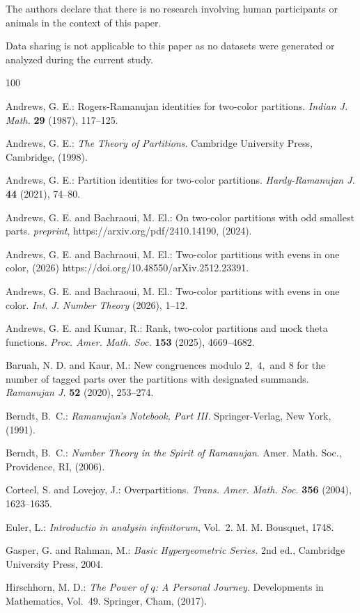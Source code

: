 \documentclass[12pt]{article}
\numberwithin{equation}{section}
\theoremstyle{definition}
\theoremstyle{remark}
\numberwithin{equation}{section}
\begin{document}
 The authors declare that there is no research involving human participants or animals in the context of this paper.	
 
 Data sharing is not applicable to this paper as no datasets were generated or analyzed during the current study.	


\begin{thebibliography}{100}
	
Andrews, G. E.: Rogers-Ramanujan identities for two-color partitions. 
\textit{Indian J. Math.} \textbf{29} (1987), 117--125.

Andrews, G. E.: \textit{The Theory of Partitions}. 
Cambridge University Press, Cambridge, (1998).

Andrews, G. E.: Partition identities for two-color partitions. 
\textit{Hardy-Ramanujan J.} \textbf{44} (2021), 74--80.

Andrews, G. E. and Bachraoui, M. El.: On two-color partitions with odd smallest parts. 
\textit{preprint}, https://arxiv.org/pdf/2410.14190, (2024).


Andrews, G. E. and Bachraoui, M. El.: Two-color partitions with evens in one color, (2026)
https://doi.org/10.48550/arXiv.2512.23391.

Andrews, G. E. and Bachraoui, M. El.: Two-color partitions with evens in one color. 
\textit{Int. J. Number Theory} (2026), 1--12.

Andrews, G. E. and Kumar, R.: Rank, two-color partitions and mock theta functions. 
\textit{Proc. Amer. Math. Soc.} \textbf{153} (2025), 4669--4682.

Baruah, N. D. and Kaur, M.: New congruences modulo $2,$ $4,$ and $8$ for the number of tagged parts over the partitions with designated summands. 
\textit{Ramanujan J.} \textbf{52} (2020), 253--274.

Berndt, B.~C.: \textit{Ramanujan's Notebook, Part III.} 
Springer-Verlag, New York, (1991).

Berndt, B.~C.: \textit{Number Theory in the Spirit of Ramanujan}. 
Amer. Math. Soc., Providence, RI, (2006).

Corteel, S. and Lovejoy, J.: Overpartitions. 
\textit{Trans. Amer. Math. Soc.} \textbf{356} (2004), 1623--1635.

Euler, L.: \textit{Introductio in analysin infinitorum}, Vol.~2. 
M. M. Bousquet, 1748.

Gasper, G. and Rahman, M.: \textit{Basic Hypergeometric Series.} 2nd ed., Cambridge University Press, 2004.

Hirschhorn, M. D.: \textit{The Power of $q$: A Personal Journey}. 
Developments in Mathematics, Vol.~49. Springer, Cham, (2017).

\end{thebibliography}
\end{document}
